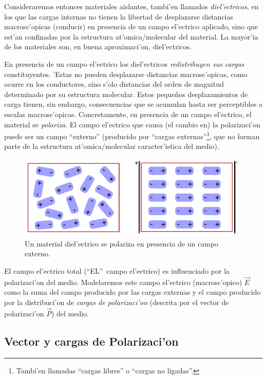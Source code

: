 Consideraremos entonces materiales aislantes, tambi'en llamados \textit{diel'ectricos}, en los que las cargas internas no tienen la
libertad de desplazarse distancias macrosc'opicas (conducir) en presencia de un
campo el'ectrico aplicado, sino que est'an confinadas por la estructura
at'omica/molecular del material. La mayor'ia de los materiales son, en buena
aproximaci'on, diel'ectricos.

En presencia de un campo el'ectrico los diel'ectricos \textit{redistribuyen sus cargas} constituyentes. 'Estas no pueden desplazarse distancias macrosc'opicas,
como ocurre en los conductores, sino s'olo distancias del orden de magnitud determinado por su estructura molecular.
Estos peque\~nos desplazamientos de carga tienen, sin embargo, consecuencias
que se acumulan hasta ser perceptibles a escalas macrosc'opicas.
Concretamente, en presencia de un campo el'ectrico, el material
se \textit{polariza}.
El campo el'ectrico que causa (el cambio en) la polarizaci'on puede ser un campo ``externo'' (producido por ``cargas externas''\footnote{Tambi'en llamadas ``cargas libres'' o ``cargas no ligadas''.}, que no forman parte
de la estructura at'omica/molecular caracter'istica del medio).
\begin{figure}[!h]
\centerline{\includegraphics[height=4cm]{fig/fig-dielectrico-01.pdf}}
\caption{Un material diel'ectrico se polariza en presencia de un campo externo.}
\label{diel01}
\end{figure}

El campo el'ectrico total (``EL''\, campo el'ectrico) es influenciado por
la polarizaci'on del medio. Modelaremos este campo el'ectrico
(macrosc'opico) $\vec{E}$ como la suma del campo
producido por las cargas externas y el campo producido por la distribuci'on
de \textit{cargas de polarizaci'on} (descrita por el vector de polarizaci'on $\vec{P}$) del medio.

\subsection{Vector y cargas de Polarizaci'on}

